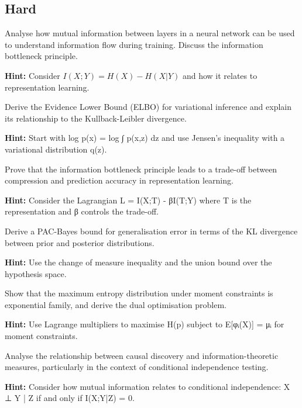 \subsection*{Hard}

\begin{problem}
Analyse how mutual information between layers in a neural network can be used to understand information flow during training. Discuss the information bottleneck principle.

\textbf{Hint:} Consider $I(X;Y) = H(X) - H(X|Y)$ and how it relates to representation learning.
\end{problem}

\begin{problem}
Derive the Evidence Lower Bound (ELBO) for variational inference and explain its relationship to the Kullback-Leibler divergence.

\textbf{Hint:} Start with log p(x) = log ∫ p(x,z) dz and use Jensen's inequality with a variational distribution q(z).
\end{problem}

\begin{problem}
Prove that the information bottleneck principle leads to a trade-off between compression and prediction accuracy in representation learning.

\textbf{Hint:} Consider the Lagrangian L = I(X;T) - βI(T;Y) where T is the representation and β controls the trade-off.
\end{problem}

\begin{problem}
Derive a PAC-Bayes bound for generalisation error in terms of the KL divergence between prior and posterior distributions.

\textbf{Hint:} Use the change of measure inequality and the union bound over the hypothesis space.
\end{problem}

\begin{problem}
Show that the maximum entropy distribution under moment constraints is exponential family, and derive the dual optimisation problem.

\textbf{Hint:} Use Lagrange multipliers to maximise H(p) subject to E[φᵢ(X)] = μᵢ for moment constraints.
\end{problem}

\begin{problem}
Analyse the relationship between causal discovery and information-theoretic measures, particularly in the context of conditional independence testing.

\textbf{Hint:} Consider how mutual information relates to conditional independence: X ⊥ Y | Z if and only if I(X;Y|Z) = 0.
\end{problem}

